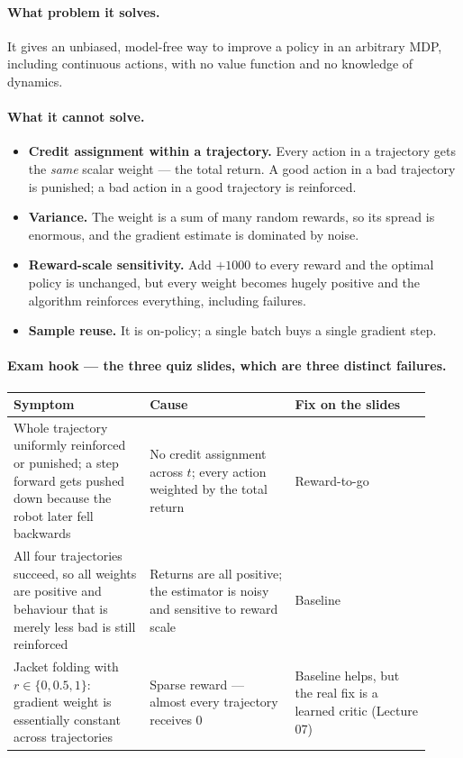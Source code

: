 \documentclass[11pt,a4paper]{article}
\begin{document}
\paragraph{What problem it solves.} It gives an unbiased, model-free way to
improve a policy in an arbitrary MDP, including continuous actions, with no
value function and no knowledge of dynamics.

\paragraph{What it cannot solve.}
\begin{itemize}
\item \textbf{Credit assignment within a trajectory.} Every action in a
trajectory gets the \emph{same} scalar weight --- the total return. A good
action in a bad trajectory is punished; a bad action in a good trajectory is
reinforced.
\item \textbf{Variance.} The weight is a sum of many random rewards, so its
spread is enormous, and the gradient estimate is dominated by noise.
\item \textbf{Reward-scale sensitivity.} Add $+1000$ to every reward and the
optimal policy is unchanged, but every weight becomes hugely positive and the
algorithm reinforces everything, including failures.
\item \textbf{Sample reuse.} It is on-policy; a single batch buys a single
gradient step.
\end{itemize}

\paragraph{Exam hook --- the three quiz slides, which are three distinct failures.}

\begin{center}
\begin{tabular}{@{}p{0.30\linewidth}p{0.32\linewidth}p{0.30\linewidth}@{}}
\toprule
\textbf{Symptom} & \textbf{Cause} & \textbf{Fix on the slides} \\
\midrule
Whole trajectory uniformly reinforced or punished; a step forward gets pushed
down because the robot later fell backwards &
No credit assignment across $t$; every action weighted by the total return &
Reward-to-go \\
\addlinespace
All four trajectories succeed, so all weights are positive and behaviour that
is merely less bad is still reinforced &
Returns are all positive; the estimator is noisy and sensitive to reward scale &
Baseline \\
\addlinespace
Jacket folding with $r\in\{0,0.5,1\}$: gradient weight is essentially constant
across trajectories &
Sparse reward --- almost every trajectory receives $0$ &
Baseline helps, but the real fix is a learned critic (Lecture 07) \\
\bottomrule
\end{tabular}
\end{center}
\end{document}

